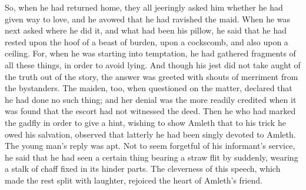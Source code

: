 \documentclass[10pt,a4paper]{report}
\begin{document}
So, when he had returned home, they all jeeringly asked him whether he had given way to love, and he avowed that he had ravished the maid. When he was next asked where he did it, and what had been his pillow, he said that he had rested upon the hoof of a beast of burden, upon a cockscomb, and also upon a ceiling. For, when he was starting into temptation, he had gathered fragments of all these things, in order to avoid lying. And though his jest did not take aught of the truth out of the story, the answer was greeted with shouts of merriment from the bystanders. The maiden, too, when questioned on the matter, declared that he had done no such thing; and her denial was the more readily credited when it was found that the escort had not witnessed the deed. Then he who had marked the gadfly in order to give a hint, wishing to show Amleth that to his trick he owed his salvation, observed that latterly he had been singly devoted to Amleth. The young man's reply was apt. Not to seem forgetful of his informant's service, he said that he had seen a certain thing bearing a straw flit by suddenly, wearing a stalk of chaff fixed in its hinder parts. The cleverness of this speech, which made the rest split with laughter, rejoiced the heart of Amleth's friend.\\
\end{document}

